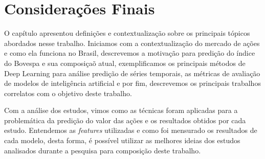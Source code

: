 \section{Considerações Finais}
\label{cf}

O capítulo apresentou definições e contextualização sobre os principais tópicos abordados nesse trabalho. Iniciamos com a contextualização do mercado de ações e como ela funciona no Brasil, descrevemos a motivação para predição do índice do Bovespa e sua composiçaõ atual, exemplificamos os principais métodos de Deep Learning para análise predição de séries temporais, as métricas de avaliação de modelos de inteligência artificial e por fim, descrevemos os principais trabalhos correlatos com o objetivo deste trabalho.

Com a análise dos estudos, vimos como as técnicas foram aplicadas para a problemática da predição do valor das ações e os resultados obtidos por cada estudo. Entendemos as  \emph{features} utilizadas e como foi mensurado os resultados de cada modelo, desta forma, é possível utilizar as melhores ideias dos estudos analisados durante a pesquisa para composição deste trabalho.
